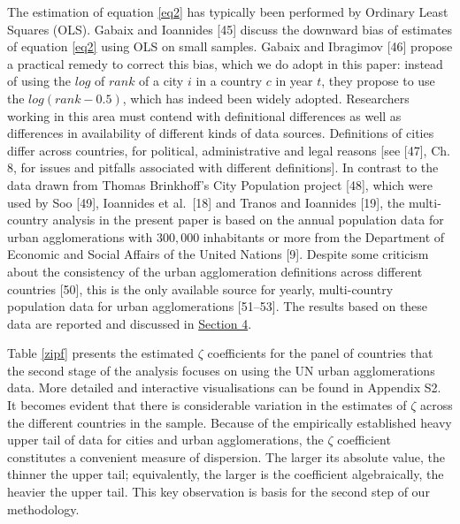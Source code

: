 \documentclass[10pt,letterpaper]{article}
\begin{document}
The estimation of equation \ref{eq2} has typically been performed by
Ordinary Least Squares (OLS). Gabaix and Ioannides {[}45{]} discuss the
downward bias of estimates of equation \ref{eq2} using OLS on small
samples. Gabaix and Ibragimov {[}46{]} propose a practical remedy to
correct this bias, which we do adopt in this paper: instead of using the
\(log\) of \(rank\) of a city \(i\) in a country \(c\) in year \(t\),
they propose to use the \(log(rank-0.5)\), which has indeed been widely
adopted. Researchers working in this area must contend with definitional
differences as well as differences in availability of different kinds of
data sources. Definitions of cities differ across countries, for
political, administrative and legal reasons {[}see {[}47{]}, Ch. 8, for
issues and pitfalls associated with different definitions{]}. In
contrast to the data drawn from Thomas Brinkhoff's City Population
project {[}48{]}, which were used by Soo {[}49{]}, Ioannides et
al.~{[}18{]} and Tranos and Ioannides {[}19{]}, the multi-country
analysis in the present paper is based on the annual population data for
urban agglomerations with \(300,000\) inhabitants or more from the
Department of Economic and Social Affairs of the United Nations {[}9{]}.
Despite some criticism about the consistency of the urban agglomeration
definitions across different countries {[}50{]}, this is the only
available source for yearly, multi-country population data for urban
agglomerations {[}51--53{]}. The results based on these data are
reported and discussed in \protect\hyperlink{sec4}{Section 4}.

Table \ref{zipf} presents the estimated \(\zeta\) coefficients for the
panel of countries that the second stage of the analysis focuses on
using the UN urban agglomerations data. More detailed and interactive
visualisations can be found in Appendix S2. It becomes evident that
there is considerable variation in the estimates of \(\zeta\) across the
different countries in the sample. Because of the empirically
established heavy upper tail of data for cities and urban
agglomerations, the \(\zeta\) coefficient constitutes a convenient
measure of dispersion. The larger its absolute value, the thinner the
upper tail; equivalently, the larger is the coefficient algebraically,
the heavier the upper tail. This key observation is basis for the second
step of our methodology.
\end{document}
